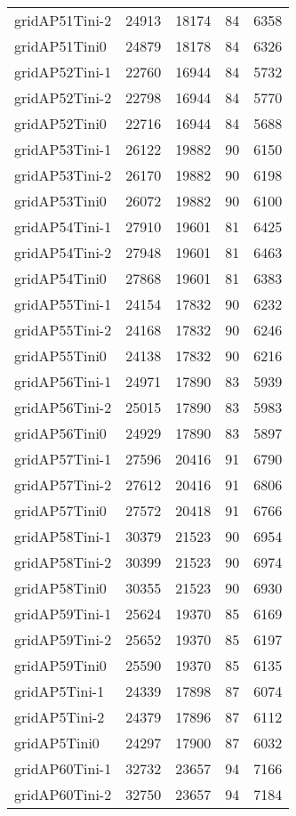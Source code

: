 \begin{tabular}{lrrrr}
gridAP51Tini-2 & 24913 & 18174 & 84 & 6358 \\
gridAP51Tini0 & 24879 & 18178 & 84 & 6326 \\
gridAP52Tini-1 & 22760 & 16944 & 84 & 5732 \\
gridAP52Tini-2 & 22798 & 16944 & 84 & 5770 \\
gridAP52Tini0 & 22716 & 16944 & 84 & 5688 \\
gridAP53Tini-1 & 26122 & 19882 & 90 & 6150 \\
gridAP53Tini-2 & 26170 & 19882 & 90 & 6198 \\
gridAP53Tini0 & 26072 & 19882 & 90 & 6100 \\
gridAP54Tini-1 & 27910 & 19601 & 81 & 6425 \\
gridAP54Tini-2 & 27948 & 19601 & 81 & 6463 \\
gridAP54Tini0 & 27868 & 19601 & 81 & 6383 \\
gridAP55Tini-1 & 24154 & 17832 & 90 & 6232 \\
gridAP55Tini-2 & 24168 & 17832 & 90 & 6246 \\
gridAP55Tini0 & 24138 & 17832 & 90 & 6216 \\
gridAP56Tini-1 & 24971 & 17890 & 83 & 5939 \\
gridAP56Tini-2 & 25015 & 17890 & 83 & 5983 \\
gridAP56Tini0 & 24929 & 17890 & 83 & 5897 \\
gridAP57Tini-1 & 27596 & 20416 & 91 & 6790 \\
gridAP57Tini-2 & 27612 & 20416 & 91 & 6806 \\
gridAP57Tini0 & 27572 & 20418 & 91 & 6766 \\
gridAP58Tini-1 & 30379 & 21523 & 90 & 6954 \\
gridAP58Tini-2 & 30399 & 21523 & 90 & 6974 \\
gridAP58Tini0 & 30355 & 21523 & 90 & 6930 \\
gridAP59Tini-1 & 25624 & 19370 & 85 & 6169 \\
gridAP59Tini-2 & 25652 & 19370 & 85 & 6197 \\
gridAP59Tini0 & 25590 & 19370 & 85 & 6135 \\
gridAP5Tini-1 & 24339 & 17898 & 87 & 6074 \\
gridAP5Tini-2 & 24379 & 17896 & 87 & 6112 \\
gridAP5Tini0 & 24297 & 17900 & 87 & 6032 \\
gridAP60Tini-1 & 32732 & 23657 & 94 & 7166 \\
gridAP60Tini-2 & 32750 & 23657 & 94 & 7184 \\

\end{tabular}
